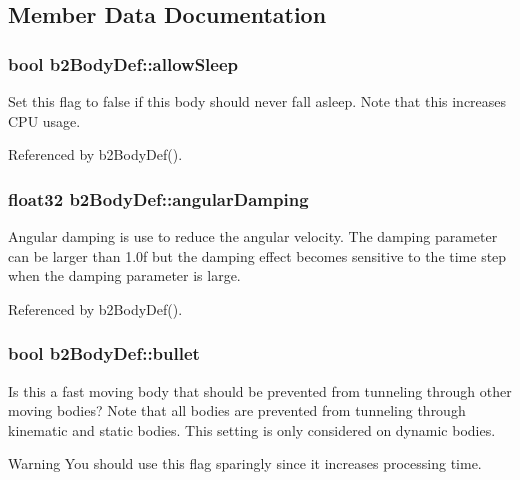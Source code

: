 \subsection{Member Data Documentation}
\hypertarget{structb2_body_def_a0765068172e521ed63cb34084c59c003}{
\subsubsection[{allow\-Sleep}]{\setlength{\rightskip}{0pt plus 5cm}bool {\bf b2\-Body\-Def\-::allow\-Sleep}}}\label{structb2_body_def_a0765068172e521ed63cb34084c59c003}
Set this flag to false if this body should never fall asleep. Note that this increases C\-P\-U usage. 

Referenced by b2\-Body\-Def().

\hypertarget{structb2_body_def_a01b8dc8ad9f0962efef9e4a8e836feb6}{
\subsubsection[{angular\-Damping}]{\setlength{\rightskip}{0pt plus 5cm}float32 {\bf b2\-Body\-Def\-::angular\-Damping}}}\label{structb2_body_def_a01b8dc8ad9f0962efef9e4a8e836feb6}
Angular damping is use to reduce the angular velocity. The damping parameter can be larger than 1.\-0f but the damping effect becomes sensitive to the time step when the damping parameter is large. 

Referenced by b2\-Body\-Def().

\hypertarget{structb2_body_def_a7c0047c9a98a1d20614eeddcdbce7586}{
\subsubsection[{bullet}]{\setlength{\rightskip}{0pt plus 5cm}bool {\bf b2\-Body\-Def\-::bullet}}}\label{structb2_body_def_a7c0047c9a98a1d20614eeddcdbce7586}
Is this a fast moving body that should be prevented from tunneling through other moving bodies? Note that all bodies are prevented from tunneling through kinematic and static bodies. This setting is only considered on dynamic bodies. \begin{DoxyWarning}{Warning}
You should use this flag sparingly since it increases processing time. 
\end{DoxyWarning}



